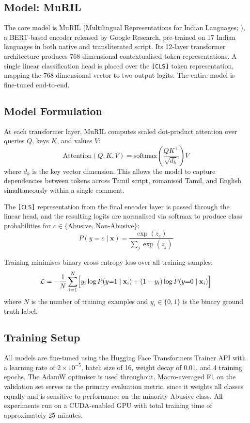 \documentclass[11pt]{article}
\begin{document}
\subsection{Model: MuRIL}
The core model is MuRIL (Multilingual Representations for Indian Languages;
\citealt{khanuja2021}), a BERT-based encoder released by Google Research, pre-trained
on 17 Indian languages in both native and transliterated script. Its 12-layer
transformer architecture produces 768-dimensional contextualised token representations.
A single linear classification head is placed over the \texttt{[CLS]} token
representation, mapping the 768-dimensional vector to two output logits. The entire
model is fine-tuned end-to-end.

\subsection{Model Formulation}
At each transformer layer, MuRIL computes scaled dot-product attention over queries
$Q$, keys $K$, and values $V$:
\begin{equation}
\text{Attention}(Q,K,V) = \text{softmax}\!\left(\frac{QK^{\top}}{\sqrt{d_k}}\right)V
\end{equation}
where $d_k$ is the key vector dimension. This allows the model to capture dependencies
between tokens across Tamil script, romanised Tamil, and English simultaneously within
a single comment.

The \texttt{[CLS]} representation from the final encoder layer is passed through the
linear head, and the resulting logits are normalised via softmax to produce class
probabilities for $c \in \{\text{Abusive},\,\text{Non-Abusive}\}$:
\begin{equation}
P(y = c \mid \mathbf{x}) = \frac{\exp(z_c)}{\sum_{j}\exp(z_j)}
\end{equation}

Training minimises binary cross-entropy loss over all training samples:
\begin{equation}
\mathcal{L} = -\frac{1}{N}\sum_{i=1}^{N}\Bigl[
  y_i \log P(y{=}1 \mid \mathbf{x}_i)
  + (1-y_i)\log P(y{=}0 \mid \mathbf{x}_i)\Bigr]
\end{equation}
where $N$ is the number of training examples and $y_i \in \{0,1\}$ is the binary
ground truth label.

\subsection{Training Setup}
All models are fine-tuned using the Hugging Face Transformers Trainer API
\citep{wolf2020} with a learning rate of $2 \times 10^{-5}$, batch size of 16,
weight decay of 0.01, and 4 training epochs. The AdamW optimiser is used throughout.
Macro-averaged F1 on the validation set serves as the primary evaluation metric,
since it weights all classes equally and is sensitive to performance on the minority
Abusive class. All experiments run on a CUDA-enabled GPU with total training time of
approximately 25 minutes.
\end{document}
